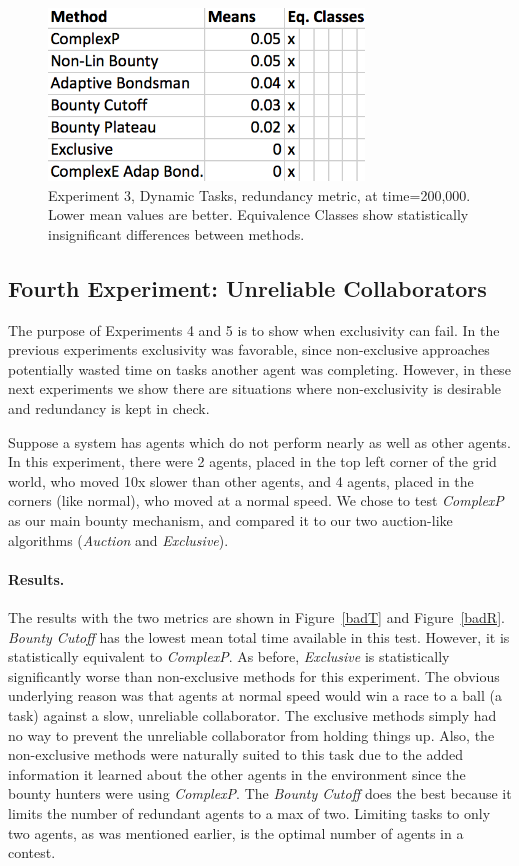 \documentclass[letterpaper]{aamas2015}
\newcommand\paragrapha[1]{\paragraph*{{#1}.}}
\begin{document}
\begin{figure}[t]
\begin{center}\includegraphics[width=3.3in]{rotR.png}\end{center}
\vspace{-0.5em}\caption{Experiment 3, Dynamic Tasks, redundancy metric, at time=200,000.  Lower mean values are better.  Equivalence Classes show statistically insignificant differences between methods.}
\label{rotR}
\end{figure}



\subsection{Fourth Experiment: Unreliable Collaborators}
The purpose of Experiments 4 and 5 is to show when exclusivity can fail. In the previous experiments exclusivity was favorable, since non-exclusive approaches potentially wasted time on tasks another agent was completing. However, in these next experiments we show there are situations where non-exclusivity is desirable and redundancy is kept in check.

Suppose a system has agents which do not perform nearly as well as other agents. In this experiment, there were 2 agents, placed in the top left corner of the grid world, who moved 10x slower than other agents, and 4 agents, placed in the corners (like normal), who moved at a normal speed. We chose to test \textit{ComplexP} as our main bounty mechanism, and compared it to our two auction-like algorithms (\textit{Auction} and \textit{Exclusive}).

\paragrapha{Results} 
The results with the two metrics are shown in Figure~\ref{badT} and Figure~\ref{badR}.  \textit{Bounty Cutoff} has the lowest mean total time available in this test.  However, it is statistically equivalent to \textit{ComplexP}.  As before, \textit{Exclusive} is statistically significantly worse than non-exclusive methods for this experiment. The obvious underlying reason was that agents at normal speed would win a race to a ball (a task) against a slow, unreliable collaborator.  The exclusive methods simply had no way to prevent the unreliable collaborator from holding things up.  Also, the non-exclusive methods were naturally suited to this task due to the added information it learned about the other agents in the environment since the bounty hunters were using \textit{ComplexP}.  The \textit{Bounty Cutoff} does the best because it limits the number of redundant agents to a max of two.  Limiting tasks to only two agents, as was mentioned earlier, is the optimal number of agents in a contest.
\end{document}

